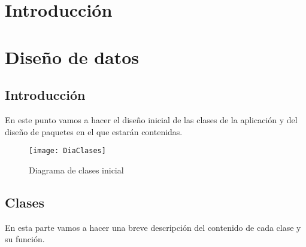 
\section{Introducción}





\section{Diseño de datos}
\subsection{Introducción}
En este punto vamos a hacer el diseño inicial de las clases de la aplicación y del diseño de paquetes en el que estarán contenidas.

\begin{figure}[h]
	\centering
	\texttt{[image: DiaClases]}
	\caption{Diagrama de clases inicial}
	\label{fig:C.1.1}
\end{figure}
 


\subsection{Clases}
En esta parte vamos a hacer una breve descripción del contenido de cada clase y su función.

